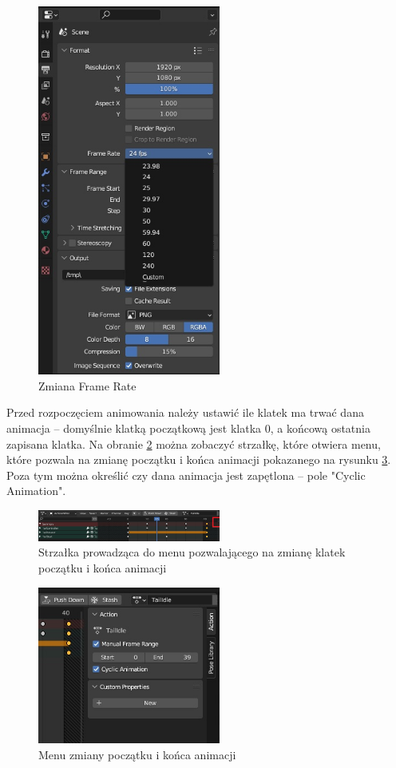 \documentclass[12pt,twoside]{article}
\begin{document}
\begin{figure}[ht!]
    \centering
    \includegraphics[width=6cm]{BlenderPict/Animation_FrameRate.jpg}
    \caption{Zmiana Frame Rate}
    \label{Blender:DefauitFrameRate}
\end{figure}

Przed rozpoczęciem animowania należy ustawić ile klatek ma trwać dana animacja –
domyślnie klatką początkową jest klatka 0, a końcową ostatnia zapisana klatka.
Na obranie \ref{Blender:Arrow} można zobaczyć strzałkę, które otwiera menu,
które pozwala na zmianę początku i końca animacji pokazanego na rysunku
\ref{Blender:ChangeStartFrame}. Poza tym można określić czy dana animacja jest
zapętlona -- pole "Cyclic Animation".

\begin{figure}[ht!]
    \centering
    \includegraphics[width=6cm]{BlenderPict/ActionEditor_arrow.jpg}
    \caption{Strzałka prowadząca do menu pozwalającego na zmianę klatek początku i końca animacji}
    \label{Blender:Arrow}
\end{figure}


\begin{figure}[ht!]
    \centering
    \includegraphics[width=6cm]{BlenderPict/ActionEditor_Frame_Range.jpg}
    \caption{Menu zmiany początku i końca animacji}
    \label{Blender:ChangeStartFrame}
\end{figure}
\end{document}
